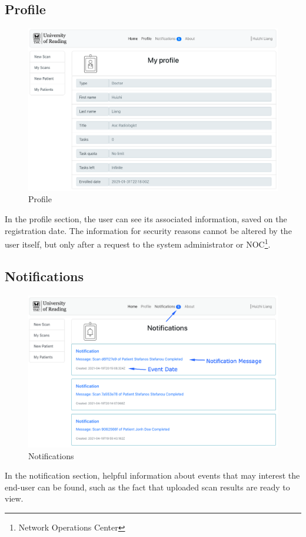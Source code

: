 		\subsection{Profile}
			\label{profile-screen}
			\begin{figure}[H]
				\iftrue
				\centering
				\caption{Profile}
				\includegraphics[scale=0.3]{figures/profile}
				\fi
			\end{figure}
			In the profile section, the user can see its associated information, saved on the registration date. 
			The information for security reasons cannot be altered by the user itself, but only after a request to 
			the system administrator or NOC\footnote{Network Operations Center}.
		\subsection{Notifications}
			\label{notification-screen}
			\begin{figure}[H]
				\iftrue
				\centering
				\caption{Notifications}
				\includegraphics[scale=0.3]{figures/notifications}
				\fi
			\end{figure}
			In the notification section, helpful information about events that may interest the end-user can be found, 
			such as the fact that uploaded scan results are ready to view. 
